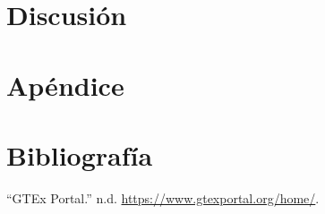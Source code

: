 \documentclass[
  english,
]{article}
\begin{document}
\hypertarget{discusiuxf3n}{%
\section{Discusión}\label{discusiuxf3n}}

\hypertarget{apuxe9ndice}{%
\section{Apéndice}\label{apuxe9ndice}}

\hypertarget{bibliografuxeda}{%
\section*{Bibliografía}\label{bibliografuxeda}}

\hypertarget{refs}{}
\leavevmode\hypertarget{ref-GTEx}{}%
``GTEx Portal.'' n.d. \url{https://www.gtexportal.org/home/}.
\end{document}
